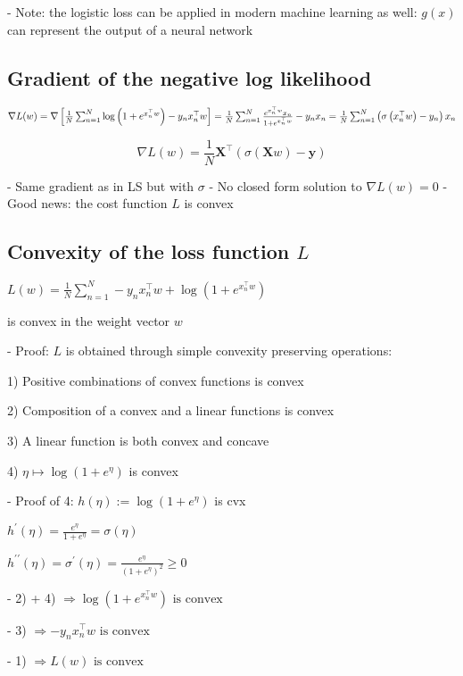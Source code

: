 - Note: the logistic loss can be applied in modern machine learning as well: $g(x)$ can represent the output of a neural network

\subsection*{Gradient of the negative log likelihood}

$\nabla L(w)=\nabla\left[\frac{1}{N} \sum_{n=1}^{N} \log \left(1+e^{x_{n}^{\top} w}\right)-y_{n} x_{n}^{\top} w\right]=\\\frac{1}{N} \sum_{n=1}^{N} \frac{e^{x_{n}^{\top} w} x_{n}}{1+e^{x_{n}^{\top} w}}-y_{n} x_{n}=\frac{1}{N} \sum_{n=1}^{N}\left(\sigma\left(x_{n}^{\top} w\right)-y_{n}\right) x_{n}$

$$
\nabla L(w)=\frac{1}{N} \mathbf{X}^{\top}(\sigma(\mathbf{X} w)-\mathbf{y})
$$

- Same gradient as in LS but with $\sigma$
- No closed form solution to $\nabla L(w)=0$
- Good news: the cost function $L$ is convex

\subsection*{Convexity of the loss function $L$}
$
L(w)=\frac{1}{N} \sum_{n=1}^{N}-y_{n} x_{n}^{\top} w+\log \left(1+e^{x_{n}^{\top} w}\right)
$

is convex in the weight vector $w$

- Proof: $L$ is obtained through simple convexity preserving operations:

1) Positive combinations of convex functions is convex

2) Composition of a convex and a linear functions is convex

3) A linear function is both convex and concave

4) $\eta \mapsto \log \left(1+e^{\eta}\right)$ is convex

- Proof of 4: $h(\eta):=\log \left(1+e^{\eta}\right)$ is cvx

$h^{\prime}(\eta)=\frac{e^{\eta}}{1+e^{\eta}}=\sigma(\eta)$

$
h^{\prime \prime}(\eta)=\sigma^{\prime}(\eta)=\frac{e^{\eta}}{\left(1+e^{\eta}\right)^{2}} \geq 0
$

- 2) + 4) $ \Rightarrow
\log \left(1+e^{x_{n}^{\top} w}\right) \text { is convex }
$

- 3) $ \Rightarrow
-y_{n} x_{n}^{\top} w \text { is convex }
$

- 1) $ \Rightarrow
L(w) \text{ is convex }
$

